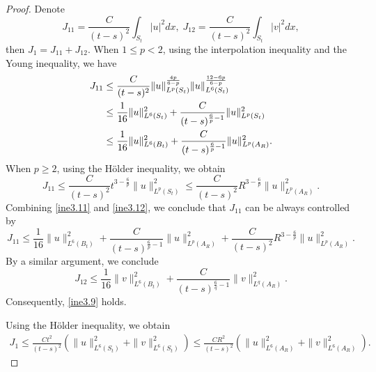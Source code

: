 \documentclass[11pt,reqno]{amsart}
\numberwithin{Thm}{section}
\begin{document}
\begin{proof}
Denote
\begin{equation*}
J_{11}=\frac{C}{(t-s)^2}\int_{S_t}|u|^2 dx,\;J_{12}=\frac{C}{(t-s)^2}\int_{S_t}|v|^2dx,
\end{equation*}
then $J_1=J_{11}+J_{12}$.
When $1\leq p<2$, using the interpolation inequality and the Young inequality, we have
\begin{equation}\label{ine3.11}
\aligned
J_{11}&\leq\frac{C}{(t-s)^{2}}\|u\|_{L^p(S_t)}^{\frac{4p}{6-p}}\|u\|_{L^6(S_t)}^{\frac{12-6p}{6-p}}\\
&\leq\frac{1}{16}\|u\|_{L^{6}(S_t)}^{2}+\frac{C}{(t-s)^{\frac{6}{p}-1}}\|u\|_{L^{p}(S_t)}^{2}\\
&\leq\frac{1}{16}\|u\|_{L^{6}(B_t)}^{2}+\frac{C}{(t-s)^{\frac{6}{p}-1}}\|u\|_{L^{p}(A_R)}^{2}.
\endaligned
\end{equation}
When $p\geq2$, using the H\"{o}lder inequality, we obtain
\begin{equation}\label{ine3.12}
J_{11}\leq\frac{C}{(t-s)^2}t^{3-\frac{6}{p}}\|u\|_{L^p (S_t)}^2\leq\frac{C}{(t-s)^2}R^{3-\frac{6}{p}}\|u\|_{L^p (A_R)}^2.
\end{equation}
Combining \eqref{ine3.11} and \eqref{ine3.12}, we conclude that $J_{11}$ can be always controlled by
\begin{equation*}
J_{11}\leq\frac{1}{16}\|u\|_{L^{6}(B_t)}^{2}+\frac{C}{(t-s)^{\frac{6}{p}-1}}\|u\|_{L^{p}(A_R)}^{2}+\frac{C}{(t-s)^2}R^{3-\frac{6}{p}}\|u\|_{L^p (A_R)}^2.
\end{equation*}
By a similar argument, we conclude
\begin{equation*}
J_{12}\leq\frac{1}{16}\|v\|_{L^{6}(B_t)}^{2}+\frac{C}{(t-s)^{\frac{6}{q}-1}}\|v\|_{L^{q}(A_R)}^{2}.
\end{equation*}
Consequently, \eqref{ine3.9} holds.


Using the H\"{o}lder inequality, we obtain
\begin{align*}
J_1\leq\frac{Ct^2}{(t-s)^2}\left(\|u\|_{L^6(S_t)}^2 +\|v\|_{L^6(S_t)}^2\right)\leq\frac{CR^2}{(t-s)^2}\left(\|u\|_{L^6(A_R)}^2 +\|v\|_{L^6(A_R)}^2\right).
\end{align*}

\end{proof}
\end{document}
